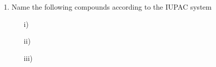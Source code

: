\begin{enumerate}
	\item Name the following compounds according to the IUPAC system
	\begin{enumerate}[topsep=0ex,itemsep=0ex,partopsep=1ex,parsep=1ex]
		\item[i)] 
		\item[ii)]
		\item[iii)] 
	\end{enumerate}
	
\end{enumerate}










